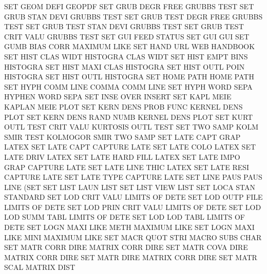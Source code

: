 SET      GEOM DEFI                      GEOPDF
SET      GRUB DEGR FREE                 GRUBBS   TEST
SET      GRUB STAN DEVI                 GRUBBS   TEST
SET      GRUB TEST DEGR FREE            GRUBBS   TEST
SET      GRUB TEST STAN DEVI            GRUBBS   TEST
SET      GRUB TEST CRIT VALU            GRUBBS   TEST
SET      GUI  FEED                      STATUS
SET      GUI                            GUI
SET      GUMB BIAS CORR                 MAXIMUM  LIKE
SET      HAND URL                       WEB      HANDBOOK
SET      HIST CLAS WIDT                 HISTOGRA CLAS WIDT
SET      HIST EMPT BINS                 HISTOGRA
SET      HIST MAXI CLAS                 HISTOGRA
SET      HIST OUTL POIN                 HISTOGRA
SET      HIST OUTL                      HISTOGRA
SET      HOME PATH                      HOME     PATH
SET      HYPH COMM LINE                 COMMA    COMM LINE
SET      HYPH WORD SEPA                 HYPHEN   WORD SEPA
SET      INSE OVER                      INSERT
SET      KAPL MEIE                      KAPLAN   MEIE PLOT
SET      KERN DENS PROB FUNC            KERNEL   DENS PLOT
SET      KERN DENS RAND NUMB            KERNEL   DENS PLOT
SET      KURT OUTL TEST CRIT VALU       KURTOSIS OUTL TEST
SET      TWO  SAMP KOLM SMIR TEST       KOLMOGOR SMIR TWO  SAMP
SET      LATE CAPT GRAP                 LATEX
SET      LATE CAPT                      CAPTURE  LATE
SET      LATE COLO                      LATEX
SET      LATE DRIV                      LATEX
SET      LATE HARD FILL                 LATEX
SET      LATE IMPO GRAP                 CAPTURE  LATE
SET      LATE LINE THIC                 LATEX
SET      LATE RESI                      CAPTURE  LATE
SET      LATE TYPE                      CAPTURE  LATE
SET      LINE PAUS                      PAUS     LINE (SET
SET      LIST LAUN                      LIST
SET      LIST VIEW                      LIST
SET      LOCA STAN                      STANDARD
SET      LOD      CRIT VALU             LIMITS   OF   DETE
SET      LOD      OUTP FILE             LIMITS   OF   DETE
SET      LOD      PRIN CRIT VALU        LIMITS   OF   DETE
SET      LOD      LOD  SUMM TABL        LIMITS   OF   DETE
SET      LOD      LOD  TABL             LIMITS   OF   DETE
SET      LOGN MAXI LIKE METH            MAXIMUM  LIKE
SET      LOGN MAXI LIKE MINI            MAXIMUM  LIKE
SET      MACR QUOT STRI                 MACRO    SUBS CHAR
SET      MATR CORR DIRE                 MATRIX   CORR DIRE
SET      MATR COVA DIRE                 MATRIX   CORR DIRE
SET      MATR DIRE                      MATRIX   CORR DIRE
SET      MATR SCAL                      MATRIX   DIST
